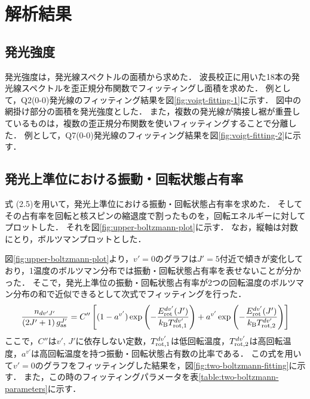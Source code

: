 \chapter{解析結果}

\section{発光強度}
発光強度は，発光線スペクトルの面積から求めた．
波長校正に用いた18本の発光線スペクトルを歪正規分布関数でフィッティングし面積を求めた．
例として，Q2(0-0)発光線のフィッティング結果を図\ref{fig:voigt-fitting-1}に示す．
図中の網掛け部分の面積を発光強度とした．
また，複数の発光線が隣接し裾が重畳しているものは，複数の歪正規分布関数を使いフィッティングすることで分離した．
例として，Q7(0-0)発光線のフィッティング結果を図\ref{fig:voigt-fitting-2}に示す．

\section{発光上準位における振動・回転状態占有率}
式 (2.5)を用いて，発光上準位における振動・回転状態占有率を求めた．
そしてその占有率を回転と核スピンの縮退度で割ったものを，回転エネルギーに対してプロットした．
それを図\ref{fig:upper-boltzmann-plot}に示す．
なお，縦軸は対数にとり，ボルツマンプロットとした．

図\ref{fig:upper-boltzmann-plot}より，$v'=0$のグラフは$J'=5$付近で傾きが変化しており，1温度のボルツマン分布では振動・回転状態占有率を表せないことが分かった．
そこで，発光上準位の振動・回転状態占有率が2つの回転温度のボルツマン分布の和で近似できるとして次式でフィッティングを行った．
\begin{equation}
    \frac{n_{dv'J'}}{\left( 2J'+1 \right)g^{J'}_{\rm as}} = C'' \left[ (1-a^{v'})\exp \left( - \frac{E^{dv'}_{\rm rot}(J')}{k_{\rm B} T^{dv'}_{\rm rot,1}} \right)+ a^{v'} \exp \left( - \frac{E^{dv'}_{\rm rot}(J')}{k_{\rm B} T^{dv'}_{\rm rot,2}} \right) \right]
\end{equation}
ここで，$C''$は$v'$, $J'$に依存しない定数，$T^{dv'}_{\rm rot,1}$は低回転温度，$T^{dv'}_{\rm rot,2}$は高回転温度，$a^{v'}$は高回転温度を持つ振動・回転状態占有数の比率である．
この式を用いて$v'=0$のグラフをフィッティングした結果を，図\ref{fig:two-boltzmann-fitting}に示す．
また，この時のフィッティングパラメータを表\ref{table:two-boltzmann-parameters}に示す．

